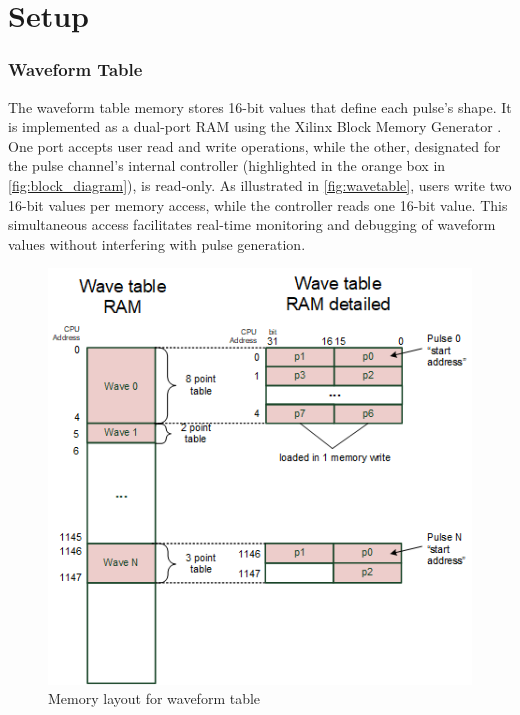 \section{Setup}
\subsubsection{Waveform Table}


The waveform table memory stores 16-bit values that define each pulse's shape. It is implemented as a dual-port RAM using the Xilinx Block Memory Generator \cite{blockmemgen}. One port accepts user read and write operations, while the other, designated for the pulse channel's internal controller (highlighted in the orange box in \autoref{fig:block_diagram}), is read-only. As illustrated in \autoref{fig:wavetable}, users write two 16-bit values per memory access, while the controller reads one 16-bit value. This simultaneous access facilitates real-time monitoring and debugging of waveform values without interfering with pulse generation.

\begin{figure}[htbp]
    \centering
    \includegraphics[width=0.5\linewidth]{figures/3.3.png}
    \caption{Memory layout for waveform table}
    \label{fig:wavetable}
\end{figure}

